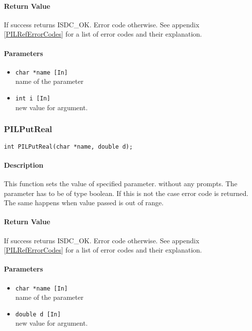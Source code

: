 \paragraph{Return Value\\}
If success returns ISDC\_OK. Error code otherwise. See appendix \ref{PILRefErrorCodes}
for a list of error codes and their explanation.

\paragraph{Parameters}
\begin{itemize}
\item
{\tt char *name [In] } \\
name of the parameter 
\item
{\tt int i [In] } \\
new value for argument.
\end{itemize}



\subsubsection{PILPutReal}

\begin{verbatim}
int PILPutReal(char *name, double d); 
\end{verbatim}

\paragraph{Description\\}
This function sets the value of specified parameter. without any prompts.
The parameter has to be of type
boolean. If this is not the case error code is returned. 
The same happens when value passed is out of range.

\paragraph{Return Value\\}
If success returns ISDC\_OK. Error code otherwise. See appendix \ref{PILRefErrorCodes}
for a list of error codes and their explanation.

\paragraph{Parameters}
\begin{itemize}
\item
{\tt char *name [In] } \\
name of the parameter 
\item
{\tt double d [In] } \\
new value for argument.
\end{itemize}


